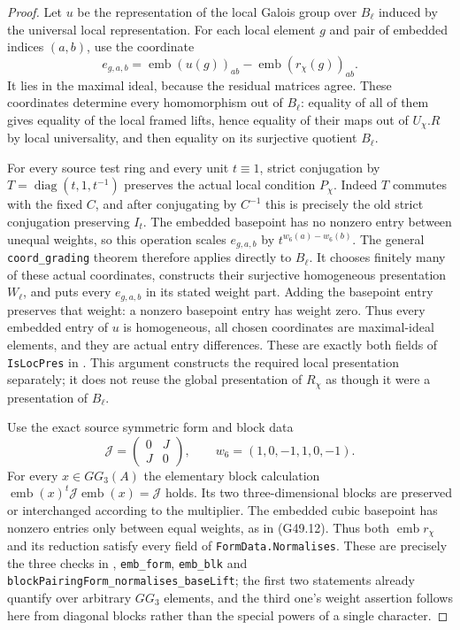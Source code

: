 \begin{proof}
Let $u$ be the representation of the local Galois group
over $B_\ell$ induced by the universal local representation.
For each local element $g$ and pair of embedded indices
$(a,b)$, use the coordinate
\[
 e_{g,a,b}=\operatorname{emb}(u(g))_{ab}
       -\operatorname{emb}(r_\chi(g))_{ab}.
\]
It lies in the maximal ideal, because the residual matrices
agree.  These coordinates determine every homomorphism out
of $B_\ell$: equality of all of them gives equality of the
local framed lifts, hence equality of their maps out of
$U_\chi.R$ by local universality, and then equality on its
surjective quotient $B_\ell$.

For every source test ring and every unit $t\equiv1$, strict
conjugation by $T=\operatorname{diag}(t,1,t^{-1})$ preserves
the actual local condition $P_\chi$.  Indeed $T$ commutes
with the fixed $C$, and after conjugating by $C^{-1}$ this
is precisely the old strict conjugation preserving $I_t$.
The embedded basepoint has no nonzero entry between
unequal weights, so this operation scales $e_{g,a,b}$ by
$t^{w_6(a)-w_6(b)}$.  The general
\texttt{coord\_grading} theorem therefore applies directly
to $B_\ell$.  It chooses finitely many of these actual
coordinates, constructs their surjective homogeneous
presentation $W_\ell$, and puts every $e_{g,a,b}$ in its
stated weight part.  Adding the basepoint entry preserves
that weight: a nonzero basepoint entry has weight zero.
Thus every embedded entry of $u$ is homogeneous, all
chosen coordinates are maximal-ideal elements, and they
are actual entry differences.  These are exactly both
fields of \texttt{IsLocPres} in
.
This argument constructs the required local presentation
separately; it does not reuse the global presentation of
$R_\chi$ as though it were a presentation of $B_\ell$.

Use the exact source symmetric form and block data
\[
                \mathcal J=\begin{pmatrix}0&J\\J&0\end{pmatrix},
          \qquad w_6=(1,0,-1,1,0,-1).                       \tag{G50.3}
\]
For every $x\in GG_3(A)$ the elementary block calculation
$\operatorname{emb}(x)^t\mathcal J\operatorname{emb}(x)=\mathcal J$
holds.  Its two three-dimensional blocks are preserved
or interchanged according to the multiplier.
The embedded cubic basepoint has nonzero entries only
between equal weights, as in (G49.12).
Thus both $\operatorname{emb}r_\chi$ and its reduction
satisfy every field of \texttt{FormData.Normalises}.
These are precisely the three checks in
,
\texttt{emb\_form}, \texttt{emb\_blk} and
\texttt{blockPairingForm\_normalises\_baseLift}; the first
two statements already quantify over arbitrary $GG_3$
elements, and the third one's weight assertion follows
here from diagonal blocks rather than the special powers
of a single character.


\end{proof}
